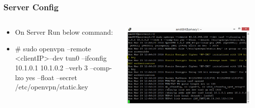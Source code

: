 \documentclass{beamer}
\begin{document}
\begin{frame}
\frametitle{Server Config}
\begin{columns}
    \begin{column}{0.48\textwidth}
	\begin{itemize}
	\item On Server Run below command:\\
	\item \# sudo openvpn {\color{red}{--proto tcp-server}} --remote \textless clientIP\textgreater  --dev tun0 --ifconfig 10.1.0.1 10.1.0.2 --verb 3 --comp-lzo yes --float --secret /etc/openvpn/static.key
        \end{itemize}
    \end{column}
    \begin{column}{.5\textwidth}
        \includegraphics[width=.9\linewidth]{am1}
    \end{column}
\end{columns}
\end{frame}
\end{document}
